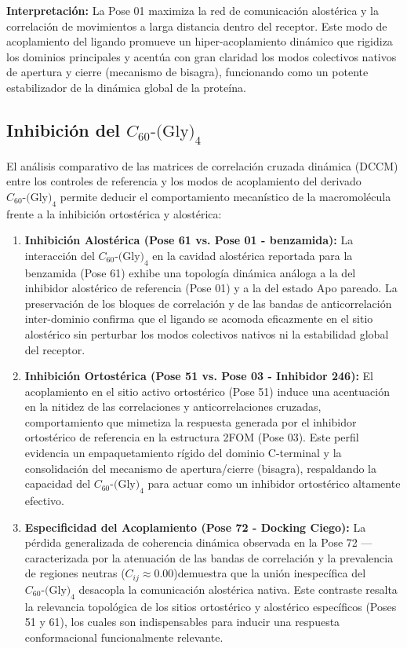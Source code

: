 \textbf{Interpretación:} La Pose 01 maximiza la red de comunicación alostérica y la correlación de movimientos a larga distancia dentro del receptor. Este modo de acoplamiento del ligando promueve un hiper-acoplamiento dinámico que rigidiza los dominios principales y acentúa con gran claridad los modos colectivos nativos de apertura y cierre (mecanismo de bisagra), funcionando como un potente estabilizador de la dinámica global de la proteína.

\subsection*{Inhibición del $C_{60}\text{-(Gly)}_4$}

El análisis comparativo de las matrices de correlación cruzada dinámica (DCCM) entre los controles de referencia y los modos de acoplamiento del derivado $C_{60}\text{-(Gly)}_4$ permite deducir el comportamiento mecanístico de la macromolécula frente a la inhibición ortostérica y alostérica:

\begin{enumerate}
    \item \textbf{Inhibición Alostérica (Pose 61 vs. Pose 01 - benzamida):} La interacción del $C_{60}\text{-(Gly)}_4$ en la cavidad alostérica reportada para la benzamida (Pose 61) exhibe una topología dinámica análoga a la del inhibidor alostérico de referencia (Pose 01) y a la del estado Apo pareado. La preservación de los bloques de correlación y de las bandas de anticorrelación inter-dominio confirma que el ligando se acomoda eficazmente en el sitio alostérico sin perturbar los modos colectivos nativos ni la estabilidad global del receptor.

    \item \textbf{Inhibición Ortostérica (Pose 51 vs. Pose 03 - Inhibidor 246):} El acoplamiento en el sitio activo ortostérico (Pose 51) induce una acentuación en la nitidez de las correlaciones y anticorrelaciones cruzadas, comportamiento que mimetiza la respuesta generada por el inhibidor ortostérico de referencia en la estructura 2FOM (Pose 03). Este perfil evidencia un empaquetamiento rígido del dominio C-terminal y la consolidación del mecanismo de apertura/cierre (bisagra), respaldando la capacidad del $C_{60}\text{-(Gly)}_4$ para actuar como un inhibidor ortostérico altamente efectivo.

    \item \textbf{Especificidad del Acoplamiento (Pose 72 - Docking Ciego):} La pérdida generalizada de coherencia dinámica observada en la Pose 72 —caracterizada por la atenuación de las bandas de correlación y la prevalencia de regiones neutras ($C_{ij} \approx 0.00$)demuestra que la unión inespecífica del $C_{60}\text{-(Gly)}_4$ desacopla la comunicación alostérica nativa. Este contraste resalta la relevancia topológica de los sitios ortostérico y alostérico específicos (Poses 51 y 61), los cuales son indispensables para inducir una respuesta conformacional funcionalmente relevante.
\end{enumerate}

